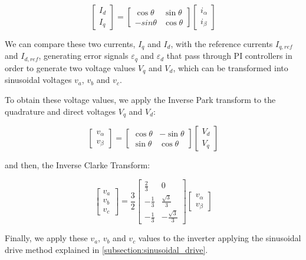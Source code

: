 \[
\begin{bmatrix}
I_{d}\\
I_{q}
\end{bmatrix}
=
\begin{bmatrix}
\cos \theta & \sin \theta \\ 
-sin \theta & \cos \theta
\end{bmatrix}
\begin{bmatrix}
i_{\alpha}\\
i_{\beta}
\end{bmatrix}
\]

We can compare these two currents, $I_{q}$ and $I_{d}$, with the reference currents $I_{q,ref}$ and $I_{d,ref}$, generating error signals $\varepsilon_{q}$ and $\varepsilon_{d}$ that pass through \ac{PI} controllers in order to generate two voltage values $V_{q}$ and $V_{d}$, which can be transformed into sinusoidal voltages $v_{a}$, $v_{b}$ and $v_{c}$.

To obtain these voltage values, we apply the Inverse Park transform to the quadrature and direct voltages $V_{q}$ and $V_{d}$:

\[
\begin{bmatrix}
v_{\alpha}\\
v_{\beta}
\end{bmatrix}
=
\begin{bmatrix}
\cos \theta & -\sin \theta \\ 
\sin \theta & \cos \theta
\end{bmatrix}
\begin{bmatrix}
V_{d}\\
V_{q}
\end{bmatrix}
\]

and then, the Inverse Clarke Transform:

\[
\begin{bmatrix}
v_{a}\\ 
v_{b}\\
v_{c}
\end{bmatrix}
=
\frac{3}{2}
\begin{bmatrix}
\frac{2}{3} & 0\\
-\frac{1}{3} & \frac{\sqrt{3}}{3}\\
-\frac{1}{3} & -\frac{\sqrt{3}}{3}
\end{bmatrix}
\begin{bmatrix}
v_{\alpha}\\
v_{\beta}
\end{bmatrix}
\]

Finally, we apply these  $v_{a}$, $v_{b}$ and $v_{c}$ values to the inverter applying the sinusoidal drive method explained in \ref{subsection:sinusoidal_drive}.

